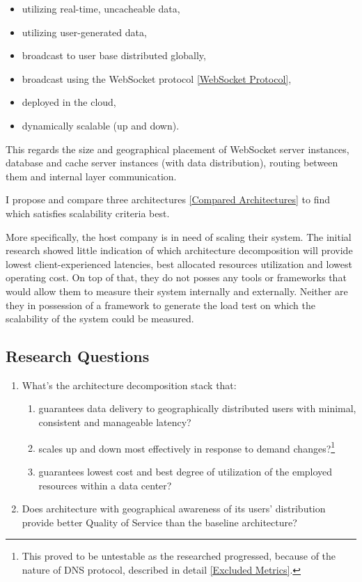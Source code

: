 \documentclass{uvamscse}
\begin{document}
\begin{itemize}
  \item utilizing real-time, uncacheable data,
  \item utilizing user-generated data,
  \item broadcast to user base distributed globally,
  \item broadcast using the WebSocket protocol \ref{WebSocket Protocol},
  \item deployed in the cloud,
  \item dynamically scalable (up and down).
\end{itemize}

This regards the size and geographical placement of WebSocket server instances, database and cache server instances (with data distribution), routing between them and internal layer communication.

I propose and compare three architectures \ref{Compared Architectures} to find which satisfies scalability criteria best.

More specifically, the host company is in need of scaling their system. The initial research showed little indication of which architecture decomposition will provide lowest client-experienced latencies, best allocated resources utilization and lowest operating cost. On top of that, they do not posses any tools or frameworks that would allow them to measure their system internally and externally. Neither are they in possession of a framework to generate the load test on which the scalability of the system could be measured.

\subsection{Research Questions}\label{Research Questions}
\begin{enumerate}
  \item What's the architecture decomposition stack that:
    \begin{enumerate}
      \item guarantees data delivery to geographically distributed users with minimal, consistent and manageable latency?
      \item scales up and down most effectively in response to demand changes?\footnote{This proved to be untestable as the researched progressed, because of the nature of DNS protocol, described in detail \ref{Excluded Metrics}.}
      \item guarantees lowest cost and best degree of utilization of the employed resources within a data center?
    \end{enumerate}
  \item Does architecture with geographical awareness of its users' distribution provide better Quality of Service than the baseline architecture?
\end{enumerate}
\end{document}
